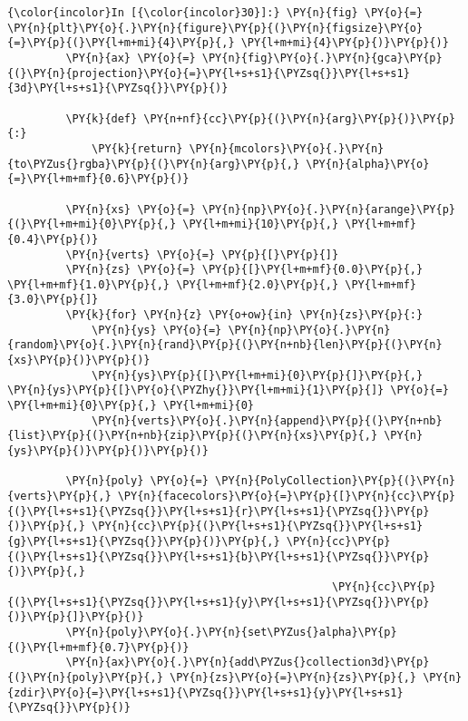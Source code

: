     \begin{Verbatim}[commandchars=\\\{\}]
{\color{incolor}In [{\color{incolor}30}]:} \PY{n}{fig} \PY{o}{=} \PY{n}{plt}\PY{o}{.}\PY{n}{figure}\PY{p}{(}\PY{n}{figsize}\PY{o}{=}\PY{p}{(}\PY{l+m+mi}{4}\PY{p}{,} \PY{l+m+mi}{4}\PY{p}{)}\PY{p}{)}
         \PY{n}{ax} \PY{o}{=} \PY{n}{fig}\PY{o}{.}\PY{n}{gca}\PY{p}{(}\PY{n}{projection}\PY{o}{=}\PY{l+s+s1}{\PYZsq{}}\PY{l+s+s1}{3d}\PY{l+s+s1}{\PYZsq{}}\PY{p}{)}
         
         \PY{k}{def} \PY{n+nf}{cc}\PY{p}{(}\PY{n}{arg}\PY{p}{)}\PY{p}{:}
             \PY{k}{return} \PY{n}{mcolors}\PY{o}{.}\PY{n}{to\PYZus{}rgba}\PY{p}{(}\PY{n}{arg}\PY{p}{,} \PY{n}{alpha}\PY{o}{=}\PY{l+m+mf}{0.6}\PY{p}{)}
         
         \PY{n}{xs} \PY{o}{=} \PY{n}{np}\PY{o}{.}\PY{n}{arange}\PY{p}{(}\PY{l+m+mi}{0}\PY{p}{,} \PY{l+m+mi}{10}\PY{p}{,} \PY{l+m+mf}{0.4}\PY{p}{)}
         \PY{n}{verts} \PY{o}{=} \PY{p}{[}\PY{p}{]}
         \PY{n}{zs} \PY{o}{=} \PY{p}{[}\PY{l+m+mf}{0.0}\PY{p}{,} \PY{l+m+mf}{1.0}\PY{p}{,} \PY{l+m+mf}{2.0}\PY{p}{,} \PY{l+m+mf}{3.0}\PY{p}{]}
         \PY{k}{for} \PY{n}{z} \PY{o+ow}{in} \PY{n}{zs}\PY{p}{:}
             \PY{n}{ys} \PY{o}{=} \PY{n}{np}\PY{o}{.}\PY{n}{random}\PY{o}{.}\PY{n}{rand}\PY{p}{(}\PY{n+nb}{len}\PY{p}{(}\PY{n}{xs}\PY{p}{)}\PY{p}{)}
             \PY{n}{ys}\PY{p}{[}\PY{l+m+mi}{0}\PY{p}{]}\PY{p}{,} \PY{n}{ys}\PY{p}{[}\PY{o}{\PYZhy{}}\PY{l+m+mi}{1}\PY{p}{]} \PY{o}{=} \PY{l+m+mi}{0}\PY{p}{,} \PY{l+m+mi}{0}
             \PY{n}{verts}\PY{o}{.}\PY{n}{append}\PY{p}{(}\PY{n+nb}{list}\PY{p}{(}\PY{n+nb}{zip}\PY{p}{(}\PY{n}{xs}\PY{p}{,} \PY{n}{ys}\PY{p}{)}\PY{p}{)}\PY{p}{)}
         
         \PY{n}{poly} \PY{o}{=} \PY{n}{PolyCollection}\PY{p}{(}\PY{n}{verts}\PY{p}{,} \PY{n}{facecolors}\PY{o}{=}\PY{p}{[}\PY{n}{cc}\PY{p}{(}\PY{l+s+s1}{\PYZsq{}}\PY{l+s+s1}{r}\PY{l+s+s1}{\PYZsq{}}\PY{p}{)}\PY{p}{,} \PY{n}{cc}\PY{p}{(}\PY{l+s+s1}{\PYZsq{}}\PY{l+s+s1}{g}\PY{l+s+s1}{\PYZsq{}}\PY{p}{)}\PY{p}{,} \PY{n}{cc}\PY{p}{(}\PY{l+s+s1}{\PYZsq{}}\PY{l+s+s1}{b}\PY{l+s+s1}{\PYZsq{}}\PY{p}{)}\PY{p}{,}
                                                  \PY{n}{cc}\PY{p}{(}\PY{l+s+s1}{\PYZsq{}}\PY{l+s+s1}{y}\PY{l+s+s1}{\PYZsq{}}\PY{p}{)}\PY{p}{]}\PY{p}{)}
         \PY{n}{poly}\PY{o}{.}\PY{n}{set\PYZus{}alpha}\PY{p}{(}\PY{l+m+mf}{0.7}\PY{p}{)}
         \PY{n}{ax}\PY{o}{.}\PY{n}{add\PYZus{}collection3d}\PY{p}{(}\PY{n}{poly}\PY{p}{,} \PY{n}{zs}\PY{o}{=}\PY{n}{zs}\PY{p}{,} \PY{n}{zdir}\PY{o}{=}\PY{l+s+s1}{\PYZsq{}}\PY{l+s+s1}{y}\PY{l+s+s1}{\PYZsq{}}\PY{p}{)}
         

\end{Verbatim}
